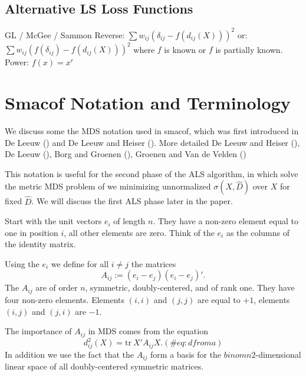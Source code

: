 \documentclass[
  12pt,
  letterpaper,
  DIV=11,
  numbers=noendperiod]{scrartcl}
\newcommand{\sectionbreak}{\clearpage}
\theoremstyle{plain}
\theoremstyle{remark}
\begin{document}
\subsection{Alternative LS Loss
Functions}\label{alternative-ls-loss-functions}

GL / McGee / Sammon Reverse: \(\sum w_{ij}(\delta_{ij}-f(d_{ij}(X)))^2\)
or: \(\sum w_{ij}(f(\delta_{ij})-f(d_{ij}(X)))^2\) where \(f\) is known
or \(f\) is partially known. Power: \(f(x)=x^r\)

\sectionbreak

\section{Smacof Notation and
Terminology}\label{smacof-notation-and-terminology}

We discuss some the MDS notation used in smacof, which was first
introduced in De Leeuw () and De Leeuw
and Heiser (). More detailed De
Leeuw and Heiser (), De Leeuw
(), Borg and Groenen
(), Groenen and Van de Velden
()

This notation is useful for the second phase of the ALS algorithm, in
which solve the metric MDS problem of we minimizing unnormalized
\(\sigma(X,\hat D)\) over \(X\) for fixed \(\hat D\). We will discuss
the first ALS phase later in the paper.

Start with the unit vectors \(e_i\) of length \(n\). They have a
non-zero element equal to one in position \(i\), all other elements are
zero. Think of the \(e_i\) as the columns of the identity matrix.

Using the \(e_i\) we define for all \(i\not= j\) the matrices
\begin{equation}
A_{ij}:=(e_i-e_j)(e_i-e_j)'.
\end{equation} The \(A_{ij}\) are of order \(n\), symmetric,
doubly-centered, and of rank one. They have four non-zero elements.
Elements \((i,i)\) and \((j,j)\) are equal to \(+1\), elements \((i,j)\)
and \((j,i)\) are \(-1\).

The importance of \(A_{ij}\) in MDS comes from the equation
\begin{equation}
d_{ij}^2(X)=\text{tr}\ X'A_{ij}X.
(\#eq:dfroma)
\end{equation} In addition we use the fact that the \(A_{ij}\) form a
basis for the \(binom{n}{2}\)-dimensional linear space of all
doubly-centered symmetric matrices.
\end{document}
